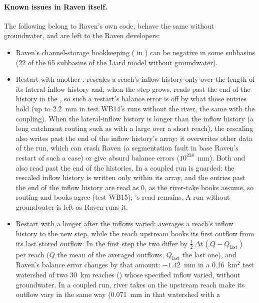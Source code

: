 \paragraph{Known issues in Raven itself.} The following belong to Raven's own code, behave the same without groundwater, and
are left to the Raven developers:
\begin{itemize}
\item Raven's channel-storage bookkeeping ( in ) can be negative in some subbasins
(22 of the 65 subbasins of the Liard model without groundwater).
\item Restart with another :  rescales a reach's inflow history only over the length
of its lateral-inflow history and, when the step grows, reads past the end of the history in the , so such a
restart's balance error is off by what those entries hold (up to 2.2~mm in test WB14's runs without the river, the same
with the coupling). When the lateral-inflow history is longer than the inflow history (a long catchment routing such
as  with a large  over a short reach), the rescaling also writes past the end
of the inflow history's array: it overwrites other data of the run, which can crash Raven (a segmentation fault in base
Raven's restart of such a case) or give absurd balance errors ($10^{238}$~mm). Both  and
 also read past the end of the  histories. In a coupled run  is
guarded: the rescaled inflow history is written only within its array, and the entries past the end of the 
inflow history are read as 0, as the river-take books assume, so routing and books agree (test WB15);
's read remains. A run without groundwater is left as Raven runs it.
\item Restart with a longer  after the inflows varied:  averages a reach's inflow history
to the new step, while the reach upstream books its first outflow from its last stored outflow. In the first step the two
differ by $\tfrac12\,\Delta t\,(\bar Q-Q_\mathrm{last})$ per reach ($\bar Q$ the mean of the averaged outflows,
$Q_\mathrm{last}$ the last one), and Raven's balance error changes by that amount: $-1.42$~mm in a 0.16~km$^2$ test
watershed of two 30~km reaches () whose specified inflow varied, without groundwater. In a
coupled run, river takes on the upstream reach make its outflow vary in the same way (0.071~mm in that watershed with a

\end{itemize}
